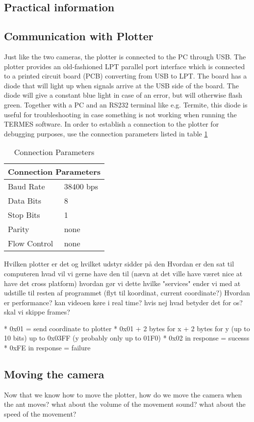 \subsection{Practical information}

\subsection{Communication with Plotter}
Just like the two cameras, the plotter is connected to the PC through USB. The plotter provides an old-fashioned LPT parallel port interface which is connected to a printed circuit board (PCB) converting from USB to LPT. The board has a diode that will light up when signals arrive at the USB side of the board. The diode will give a constant blue light in case of an error, but will otherwise flash green. Together with a PC and an RS232 terminal like e.g. Termite, this diode is useful for troubleshooting in case something is not working when running the TERMES software. In order to establish a connection to the plotter for debugging purposes, use the connection parameters listed in table \ref{table:connparam}

\begin{table}[h]
\centering
\renewcommand{\arraystretch}{1.1}
\setlength{\tabcolsep}{8pt}
	\begin{tabular}{ |l|l| }
  	\hline
  	\multicolumn{2}{|c|}{Connection Parameters} \\
  	\hline
  	Baud Rate & 38400 bps \\
  	Data Bits & 8 \\
  	Stop Bits & 1 \\
  	Parity & none \\
  	Flow Control & none \\
  	\hline
	\end{tabular}
	\caption{Connection Parameters}
	\label{table:connparam}
\end{table}








Hvilken plotter er det og hvilket udstyr sidder på den
Hvordan er den sat til computeren
hvad vil vi gerne have den til (nævn at det ville have været nice at have det cross platform)
hvordan gør vi dette
hvilke "services" ender vi med at udstille til resten af programmet (flyt til koordinat, current coordinate?)
Hvordan er performance? kan videoen køre i real time? hvis nej hvad betyder det for os? skal vi skippe frames?

*   0x01 = send coordinate to plotter
 *   0x01 + 2 bytes for x + 2 bytes for y (up to 10 bits) up to 0x03FF (y probably only up to 01F0)
 *   0x02 in response = sucesss
 *   0xFE in response = failure
 
\subsection{Moving the camera}
Now that we know how to move the plotter, how do we move the camera when the ant moves?
what about the volume of the movement sound?
what about the speed of the movement?
